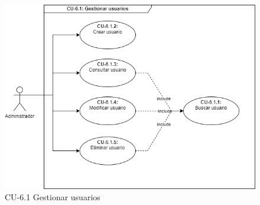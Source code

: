 \begin{figure}[H]
        \centering
        \includegraphics[scale=0.55]{img/diagramas/Funcional/CU-6.1.png}
        \caption{CU-6.1 Gestionar usuarios}
        \label{fig:Diagrama-Caso de uso 6.1 Gestionar usuarios}
\end{figure}


